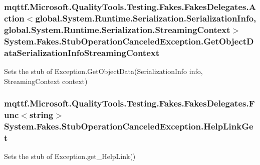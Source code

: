 \hypertarget{class_system_1_1_fakes_1_1_stub_operation_canceled_exception_a608d19cb3c0302d94c427e42abf216ac}{
\subsubsection[{Get\-Object\-Data\-Serialization\-Info\-Streaming\-Context}]{\setlength{\rightskip}{0pt plus 5cm}mqttf.\-Microsoft.\-Quality\-Tools.\-Testing.\-Fakes.\-Fakes\-Delegates.\-Action$<$global.\-System.\-Runtime.\-Serialization.\-Serialization\-Info, global.\-System.\-Runtime.\-Serialization.\-Streaming\-Context$>$ System.\-Fakes.\-Stub\-Operation\-Canceled\-Exception.\-Get\-Object\-Data\-Serialization\-Info\-Streaming\-Context}}\label{class_system_1_1_fakes_1_1_stub_operation_canceled_exception_a608d19cb3c0302d94c427e42abf216ac}


Sets the stub of Exception.\-Get\-Object\-Data(\-Serialization\-Info info, Streaming\-Context context)

\hypertarget{class_system_1_1_fakes_1_1_stub_operation_canceled_exception_af032fa9c5a2cf29f6e81efd74ae4cb35}{
\subsubsection[{Help\-Link\-Get}]{\setlength{\rightskip}{0pt plus 5cm}mqttf.\-Microsoft.\-Quality\-Tools.\-Testing.\-Fakes.\-Fakes\-Delegates.\-Func$<$string$>$ System.\-Fakes.\-Stub\-Operation\-Canceled\-Exception.\-Help\-Link\-Get}}\label{class_system_1_1_fakes_1_1_stub_operation_canceled_exception_af032fa9c5a2cf29f6e81efd74ae4cb35}


Sets the stub of Exception.\-get\-\_\-\-Help\-Link()

